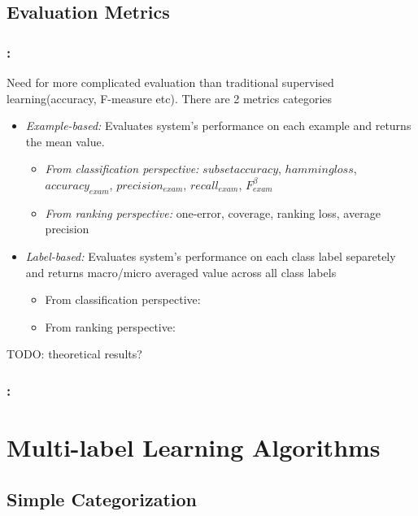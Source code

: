 \documentclass{beamer}
\begin{document}
\subsection{Evaluation Metrics}
\begin{frame}
\frametitle{\insertsection : \insertsubsection}
Need for more complicated evaluation than traditional supervised learning(accuracy, F-measure etc). There are 2 metrics categories 
	\begin{itemize}
		\item \emph{Example-based: }Evaluates system's performance on each example and returns the mean value. 
		\begin{itemize}
			\item \emph{From classification perspective:} $subset accuracy$, $hamming loss$, $accuracy_{exam}$, $precision_{exam}$, $recall_{exam}$, $F^\beta_{exam}$
			\item \emph{From ranking perspective:} one-error, coverage, ranking loss, average precision
		\end{itemize}
		\item \emph{Label-based: }Evaluates system's performance on each class label separetely and returns macro/micro averaged value across all class labels
		\begin{itemize}
			\item From classification perspective:
			\item From ranking perspective:
		\end{itemize}
	\end{itemize}
TODO: theoretical results?
\end{frame}

\begin{frame}
\frametitle{\insertsection : \insertsubsection}
\end{frame}

\section{Multi-label Learning Algorithms}


\subsection{Simple Categorization}
\end{document}
